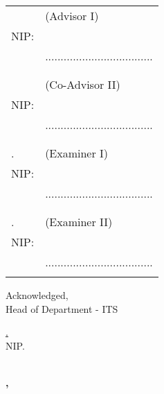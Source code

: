 \noindent
\begin{tabularx}{\textwidth}{X l}
  \advisor{}               & (Advisor I)                         \\
  NIP: \advisornip{}       &                                     \\
                           & ................................... \\
                           &                                     \\
                           &                                     \\
  \coadvisor{}             & (Co-Advisor II)                     \\
  NIP: \coadvisornip{}     &                                     \\
                           & ................................... \\
                           &                                     \\
                           &                                     \\
  \examinerone{}.          & (Examiner I)                        \\
  NIP: \examineronenip{}   &                                     \\
                           & ................................... \\
                           &                                     \\
                           &                                     \\
  \examinertwo{}.          & (Examiner II)                       \\
  NIP: \examinertwonip{}   &                                     \\
                           & ................................... \\
                           &                                     \\
\end{tabularx}
\endgroup


\begin{center}
  Acknowledged, \\
  Head of \engdepartment{} Department \engfacultyshort{} - ITS \\

  \vspace{8ex}

  \underline{\headofdepartment{}.} \\
  NIP. \headofdepartmentnip{}
\end{center}

\begin{center}
  \textbf{\MakeUppercase{\place{}}\\\ENGMONTH{}, \the\year{}}
\end{center}
\endgroup

